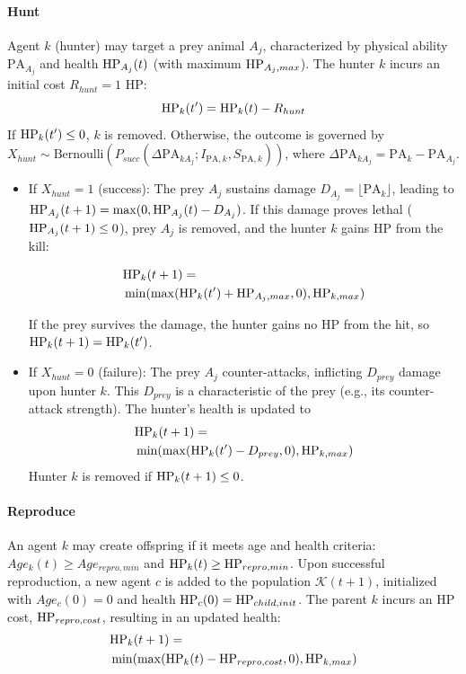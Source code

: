 \paragraph{Hunt}
Agent $k$ (hunter) may target a prey animal $A_j$, characterized by physical ability $\mathrm{PA}_{A_j}$ and health $\mathrm{HP}_{A_j}(t)$ (with maximum $\mathrm{HP}_{A_j,max}$). The hunter $k$ incurs an initial cost $R_{hunt}=1$ HP:
$$ \mathrm{HP}_k(t') = \mathrm{HP}_k(t) - R_{hunt} $$
If $\mathrm{HP}_k(t') \le 0$, $k$ is removed. Otherwise, the outcome is governed by $X_{hunt} \sim \text{Bernoulli}(P_{succ}(\Delta \mathrm{PA}_{kA_j}; I_{\mathrm{PA},k}, S_{\mathrm{PA},k}))$, where $\Delta \mathrm{PA}_{kA_j} = \mathrm{PA}_k - \mathrm{PA}_{A_j}$.
\begin{itemize}
    \item If $X_{hunt}=1$ (success): The prey $A_j$ sustains damage $D_{A_j} = \lfloor \mathrm{PA}_k \rfloor$, leading to $\mathrm{HP}_{A_j}(t+1) = \max(0, \mathrm{HP}_{A_j}(t) - D_{A_j})$.
        If this damage proves lethal ($\mathrm{HP}_{A_j}(t+1) \le 0$), prey $A_j$ is removed, and the hunter $k$ gains HP from the kill: 
        
        {\small\begin{align*}
        &\mathrm{HP}_k(t+1) = \\&\min(\max(\mathrm{HP}_k(t') + \mathrm{HP}_{A_j,max}, 0), \mathrm{HP}_{k,max})
        \end{align*}}
        
        If the prey survives the damage, the hunter gains no HP from the hit, so $\mathrm{HP}_k(t+1) = \mathrm{HP}_k(t')$.
    \item If $X_{hunt}=0$ (failure): The prey $A_j$ counter-attacks, inflicting $D_{prey}$ damage upon hunter $k$. This $D_{prey}$ is a characteristic of the prey (e.g., its counter-attack strength). The hunter's health is updated to 
        \begin{align*}
        &\mathrm{HP}_k(t+1) = \\&\min(\max(\mathrm{HP}_k(t') - D_{prey}, 0), \mathrm{HP}_{k,max})
        \end{align*}
        Hunter $k$ is removed if $\mathrm{HP}_k(t+1) \le 0$.
\end{itemize}

\paragraph{Reproduce}
An agent $k$ may create offspring if it meets age and health criteria: $Age_k(t) \ge Age_{repro,min}$ and $\mathrm{HP}_k(t) \ge \mathrm{HP}_{repro,min}$. Upon successful reproduction, a new agent $c$ is added to the population $\mathcal{K}(t+1)$, initialized with $Age_c(0)=0$ and health $\mathrm{HP}_c(0) = \mathrm{HP}_{child,init}$. The parent $k$ incurs an HP cost, $\mathrm{HP}_{repro,cost}$, resulting in an updated health:
\begin{align*}
    &\mathrm{HP}_k(t+1) = \\&\min(\max(\mathrm{HP}_k(t) - \mathrm{HP}_{repro,cost}, 0), \mathrm{HP}_{k,max})
\end{align*}


